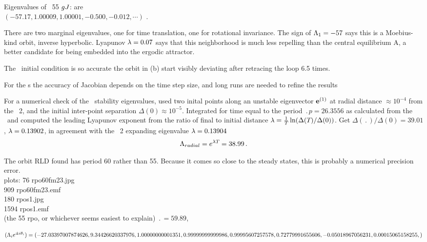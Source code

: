 Eigenvalues of \rpo\ {\nameit}55 $g{J}$: are
\\
$(-57.17,  1.00009, 1.00001, -0.500, -0.012, \cdots)$ .
%

There are two
marginal eigenvalues, one for time translation, one for
rotational invariance. 
The sign of $\Lambda_{1}=-57$ says this is a Moebius-kind orbit,
inverse hyperbolic.
Lyapunov $\lambda=0.07$ says that this neighborhood is much less repelling than
the central equilibrium A, a better candidate for being embedded into the
ergodic attractor.

The \rpo\ initial condition is
so accurate the orbit in (b)
start visibly deviating after retracing the loop 6.5 times.

For the \rpo s the accuracy of Jacobian depends
on the time step size, and long runs are needed to refine the results

For a numerical check of the \rpo\ stability eigenvalues,
used two inital
points along an unstable eigenvector ${\bf e}^{(1)}$
at radial distance  $\approx 10^{-4}$ from the \eqv\ {\nameit}2,
and the initial inter-point separation $\Delta(0) \approx 10^{-5}$.
Integrated for time equal to the period $\period{p}=26.3556$ as calculated from
the \jacobianM\ and computed the leading Lyapunov exponent from the ratio of
final to initial distance 
$\lambda= {1 \over {T_{}}}\ln( \Delta({T_{}})/\Delta(0))$.
Get
$\Delta(\period{})/\Delta(0) =39.01$,
$\lambda=0.13902$, in agreement with the \eqv\ {\nameit}2 
expanding eigenvalue $\lambda=0.13904$
\[
\Lambda_{radial} =  e^{\lambda {T_{}}} =38.99
\,.
\]

The orbit RLD found has period 60 
rather than 55.  Because it comes so close to the steady states, 
this is probably a numerical precision error.
\\
plots:
  76 rpo60fm23.jpg	\\
 909 rpo60fm23.emf	\\
 180 rpos1.jpg	\\
1594 rpos1.emf	\\


(the 55 rpo, or whichever seems easiest to explain)
$\period{} = 59.89$,

$(\Lambda_i e^{\pm i\theta_i})=
(
 -27.03397007874626,
   9.34426620337976,
   1.00000000001351,
   0.99999999999986,
   0.99995607257578,
   0.72779991655606,
  -0.05018967056231,
   0.00015065158255,
)$

